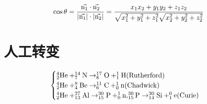 \documentclass[UTF8]{article}
\begin{document}
$$
\cos\theta=\frac{\vec{\rm{n_1}}\cdot\vec{\rm{n_2}}  }{|\vec{\rm{n_1}}|\cdot|\vec{\rm{n_2}}|}=\frac{x_{1} x_{2}+y_{1} y_{2}+z_{1} z_{2}}{\sqrt{x_{1}^{2}+y_{1}^{2}+z_{1}^{2}} \sqrt{x_{2}^{2}+y_{2}^{2}+z_{2}^{2}}}
$$
\section{人工转变}

$$
\begin{cases}\rm
    _{2}^{4}He+ _{7}^{14}N \rightarrow _{8}^{17}O + _{1}^{1}H(Rutherford)\\\rm
    _{2}^{4}He+ _{4}^{8}Be \rightarrow _{6}^{11}C + _{0}^{1}n(Chadwick)\\\rm
    _{2}^{4}He+ _{13}^{27}Al \rightarrow _{15}^{30}P + _{0}^{1}n,_{15}^{30}P \rightarrow _{14}^{30}Si + _{1}^{0}e(Curie)
    \end{cases}
$$



\end{document}
